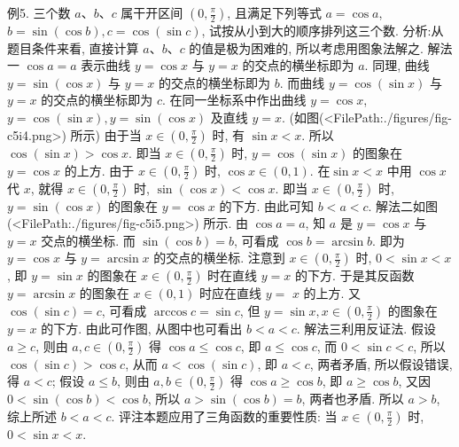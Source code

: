 例5. 三个数 $a 、 b 、 c$ 属干开区间 $\left(0, \frac{\pi}{2}\right)$, 且满足下列等式 $a=\cos a$, $b=\sin (\cos b), c=\cos (\sin c)$, 试按从小到大的顺序排列这三个数.
分析:从题目条件来看, 直接计算 $a 、 b 、 c$ 的值是极为困难的, 所以考虑用图象法解之.
解法一 $\cos a=a$ 表示曲线 $y=\cos x$ 与 $y=x$ 的交点的横坐标即为 $a$.
同理, 曲线 $y=\sin (\cos x)$ 与 $y=x$ 的交点的横坐标即为 $b$. 而曲线 $y= \cos (\sin x)$ 与 $y=x$ 的交点的横坐标即为 $c$.
在同一坐标系中作出曲线 $y=\cos x$, $y=\cos (\sin x), y=\sin (\cos x)$ 及直线 $y=x$. (如图(<FilePath:./figures/fig-c5i4.png>) 所示)
由于当 $x \in\left(0, \frac{\pi}{2}\right)$ 时, 有 $\sin x<x$. 所以 $\cos (\sin x)>\cos x$. 即当 $x \in\left(0, \frac{\pi}{2}\right)$ 时, $y=\cos (\sin x)$ 的图象在 $y=\cos x$ 的上方.
由于 $x \in\left(0, \frac{\pi}{2}\right)$ 时, $\cos x \in(0,1)$. 在$\sin x<x$ 中用 $\cos x$ 代 $x$, 就得 $x \in\left(0, \frac{\pi}{2}\right)$ 时, $\sin (\cos x)<\cos x$. 即当 $x \in\left(0, \frac{\pi}{2}\right)$ 时, $y=\sin (\cos x)$ 的图象在 $y=\cos x$ 的下方.
由此可知 $b<a<c$.
解法二如图(<FilePath:./figures/fig-c5i5.png>) 所示.
由 $\cos a=a$, 知 $a$ 是 $y=\cos x$ 与 $y=x$ 交点的横坐标.
而 $\sin (\cos b)=b$, 可看成 $\cos b= \arcsin b$. 即为 $y=\cos x$ 与 $y=\arcsin x$ 的交点的横坐标.
注意到 $x \in\left(0, \frac{\pi}{2}\right)$ 时, $0< \sin x<x$, 即 $y=\sin x$ 的图象在 $x \in\left(0, \frac{\pi}{2}\right)$ 时在直线 $y=x$ 的下方.
于是其反函数 $y= \arcsin x$ 的图象在 $x \in(0,1)$ 时应在直线 $y=$
$x$ 的上方.
又 $\cos (\sin c)=c$, 可看成 $\arccos c=\sin c$, 但 $y=\sin x, x \in\left(0, \frac{\pi}{2}\right)$ 的图象在 $y=x$ 的下方.
由此可作图, 从图中也可看出 $b<a<c$.
解法三利用反证法.
假设 $a \geqslant c$, 则由 $a, c \in\left(0, \frac{\pi}{2}\right)$ 得 $\cos a \leqslant \cos c$, 即 $a \leqslant \cos c$, 而 $0<\sin c<c$, 所以 $\cos (\sin c)>\cos c$, 从而 $a<\cos (\sin c)$, 即 $a< c$, 两者矛盾, 所以假设错误, 得 $a<c$;
假设 $a \leqslant b$, 则由 $a, b \in\left(0, \frac{\pi}{2}\right)$ 得 $\cos a \geqslant \cos b$, 即 $a \geqslant \cos b$, 又因 $0< \sin (\cos b)<\cos b$, 所以 $a>\sin (\cos b)=b$, 两者也矛盾.
所以 $a>b$, 综上所述 $b<a<c$.
评注本题应用了三角函数的重要性质: 当 $x \in\left(0, \frac{\pi}{2}\right)$ 时, $0<\sin x<x$.



